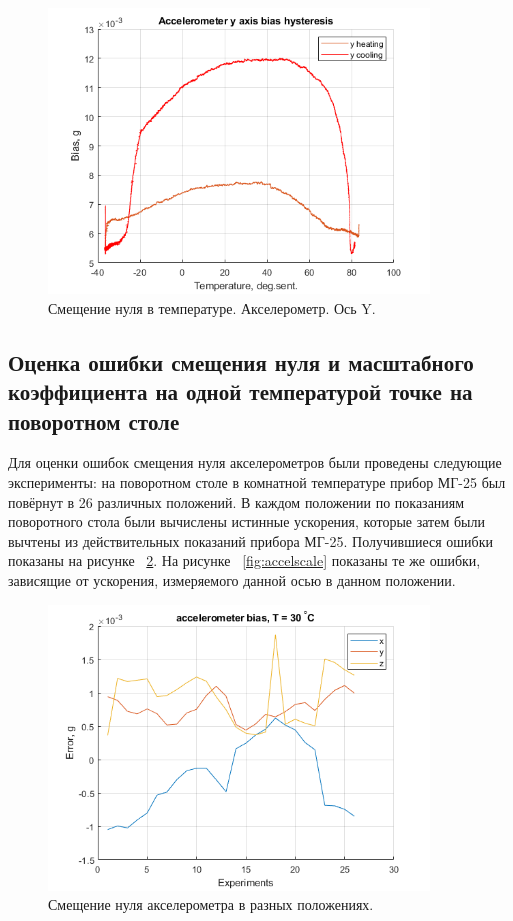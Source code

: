 \documentclass[a4paper,12pt]{article}
\begin{document}
\begin{figure}
\centering
\includegraphics[width=0.9\textwidth]{AccY_hyst.png} 
\caption{\label{fig:accY_hyst}  Смещение нуля в температуре. Акселерометр. Ось Y.}
\end{figure}


\subsection{Оценка ошибки смещения нуля и масштабного коэффициента на одной температурой точке на поворотном столе}
Для оценки ошибок смещения нуля акселерометров были проведены следующие эксперименты: на поворотном столе в комнатной температуре прибор МГ-25 был повёрнут в 26 различных положений. В каждом положении по показаниям поворотного стола были вычислены истинные ускорения, которые затем были вычтены из действительных показаний прибора МГ-25. Получившиеся ошибки показаны на рисунке  ~\ref{fig:accel_biases}. На рисунке  ~\ref{fig:accelscale} показаны те же ошибки, зависящие от ускорения, измеряемого данной осью в данном положении.

\begin{figure}
\centering
\includegraphics[width=0.9\textwidth]{accel_biases.png} 
\caption{\label{fig:accel_biases}  Смещение нуля акселерометра в разных положениях.}
\end{figure}
\end{document}
